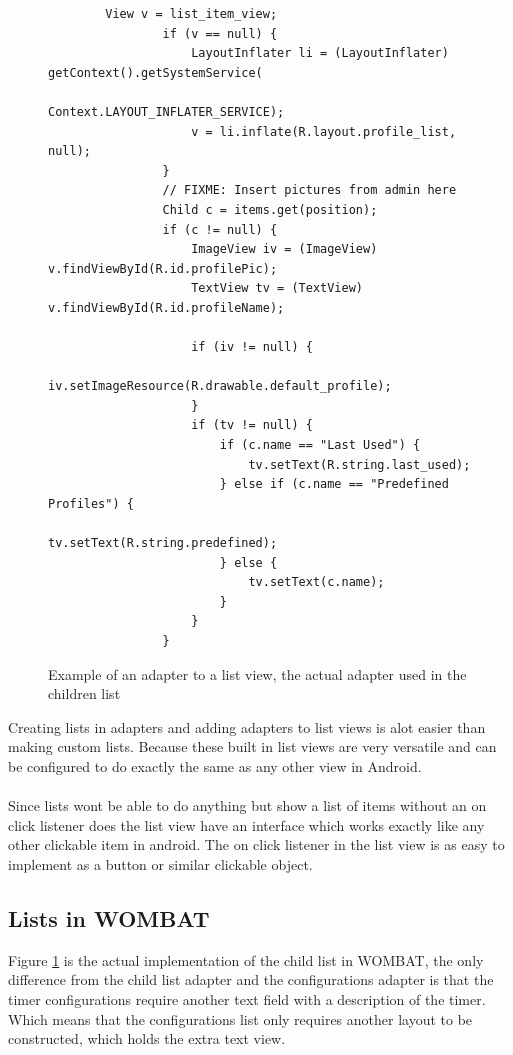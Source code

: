 \begin{figure}[H]
	\centering
		\begin{verbatim}
		View v = list_item_view;
				if (v == null) {
					LayoutInflater li = (LayoutInflater) getContext().getSystemService(
							Context.LAYOUT_INFLATER_SERVICE);
					v = li.inflate(R.layout.profile_list, null);
				}
				// FIXME: Insert pictures from admin here
				Child c = items.get(position);
				if (c != null) {
					ImageView iv = (ImageView) v.findViewById(R.id.profilePic);
					TextView tv = (TextView) v.findViewById(R.id.profileName);

					if (iv != null) {
						iv.setImageResource(R.drawable.default_profile);
					}
					if (tv != null) {
						if (c.name == "Last Used") {
							tv.setText(R.string.last_used);
						} else if (c.name == "Predefined Profiles") {
							tv.setText(R.string.predefined);
						} else {
							tv.setText(c.name);
						}
					}
				}
		\end{verbatim}
	\caption{Example of an adapter to a list view, the actual adapter used in the children list}%
	\label{code:listview_adapter_example}%
\end{figure}

Creating lists in adapters and adding adapters to list views is alot easier than making custom lists. 
Because these built in list views are very versatile and can be configured to do exactly the same as any other view in Android.\\
\\

Since lists wont be able to do anything but show a list of items without an on click listener does the list view have an interface which works exactly like any other clickable item in android.
The on click listener in the list view is as easy to implement as a button or similar clickable object.

\subsection{Lists in WOMBAT}
Figure \ref{code:listview_adapter_example} is the actual implementation of the child list in WOMBAT, the only difference from the child list adapter and the configurations adapter is that the timer configurations require another text field with a description of the timer.
Which means that the configurations list only requires another layout to be constructed, which holds the extra text view.\\
\\

